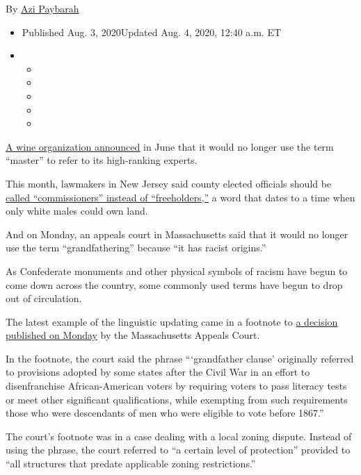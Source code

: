 By \href{https://www.nytimes3xbfgragh.onion/by/azi-paybarah}{Azi
Paybarah}

\begin{itemize}
\item
  Published Aug. 3, 2020Updated Aug. 4, 2020, 12:40 a.m. ET
\item
  \begin{itemize}
  \item
  \item
  \item
  \item
  \item
  \end{itemize}
\end{itemize}

\href{https://www.nytimes3xbfgragh.onion/2020/06/22/us/wine-master.html}{A
wine organization announced} in June that it would no longer use the
term ``master'' to refer to its high-ranking experts.

This month, lawmakers in New Jersey said county elected officials should
be
\href{https://www.nytimes3xbfgragh.onion/2020/07/10/nyregion/Freeholder-new-jersey.html}{called
``commissioners'' instead of ``freeholders,''} a word that dates to a
time when only white males could own land.

And on Monday, an appeals court in Massachusetts said that it would no
longer use the term ``grandfathering'' because ``it has racist
origins.''

As Confederate monuments and other physical symbols of racism have begun
to come down across the country, some commonly used terms have begun to
drop out of circulation.

The latest example of the linguistic updating came in a footnote to
\href{https://www.mass.gov/files/documents/2020/08/03/z19P1163.pdf}{a
decision published on Monday} by the Massachusetts Appeals Court.

In the footnote, the court said the phrase ```grandfather clause'
originally referred to provisions adopted by some states after the Civil
War in an effort to disenfranchise African-American voters by requiring
voters to pass literacy tests or meet other significant qualifications,
while exempting from such requirements those who were descendants of men
who were eligible to vote before 1867.''

The court's footnote was in a case dealing with a local zoning dispute.
Instead of using the phrase, the court referred to ``a certain level of
protection'' provided to ``all structures that predate applicable zoning
restrictions.''

